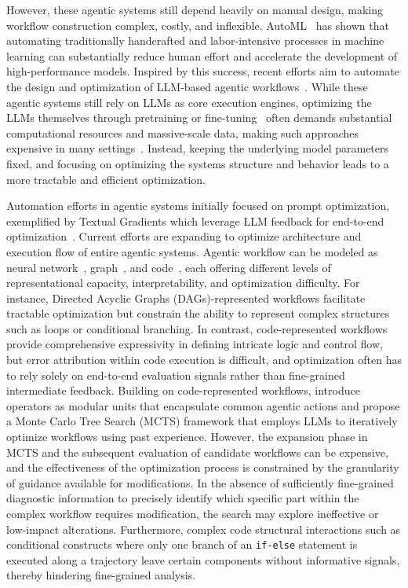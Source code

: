 \documentclass{article}
\theoremstyle{plain}
\theoremstyle{definition}
\theoremstyle{remark}
\begin{document}
However, these agentic systems still depend heavily on manual design, making workflow construction complex, costly, and inflexible. AutoML~\citep{10.5555/3360092} has shown that automating traditionally handcrafted and labor-intensive processes in machine learning can substantially reduce human effort and accelerate the development of high-performance models. Inspired by this success, recent efforts aim to automate the design and optimization of LLM-based agentic workflows~\citep{lee_compound_2025}. While these agentic systems still rely on LLMs as core execution engines, optimizing the LLMs themselves through pretraining or fine-tuning~\citep{rafailov_direct_2023} often demands substantial computational resources and massive-scale data, making such approaches expensive in many settings~\citep{kaplan_scaling_2020}. Instead, keeping the underlying model parameters fixed, and focusing on optimizing the systems structure and behavior leads to a more tractable and efficient optimization.

Automation efforts in agentic systems initially focused on prompt optimization, exemplified by Textual Gradients which leverage LLM feedback for end-to-end optimization~\citep{pryzant_automatic_2023, yuksekgonul_textgrad_2024, wang_how_2024, yin_llm-autodiff_2025}. Current efforts are expanding to optimize architecture and execution flow of entire agentic systems. Agentic workflow can be modeled as neural network~\citep{liu_dynamic_2024,ma_agentic_2025}, graph~\citep{zhuge_language_2024, zhang_multi-agent_2025}, and code~\citep{hu_automated_2025, zhang_aflow_2025, zheng_mermaidflow_2025}, each offering different levels of representational capacity, interpretability, and optimization difficulty. For instance, Directed Acyclic Graphs (DAGs)-represented workflows facilitate tractable optimization but constrain the ability to represent complex structures such as loops or conditional branching. In contrast, code-represented workflows provide comprehensive expressivity in defining intricate logic and control flow, but error attribution within code execution is difficult, and optimization often has to rely solely on end-to-end evaluation signals rather than fine-grained intermediate feedback. Building on code-represented workflows, \citet{zhang_aflow_2025} introduce operators as modular units that encapsulate common agentic actions and propose a Monte Carlo Tree Search (MCTS) framework that employs LLMs to iteratively optimize workflows using past experience. However, the expansion phase in MCTS and the subsequent evaluation of candidate workflows can be expensive, and the effectiveness of the optimization process is constrained by the granularity of guidance available for modifications. In the absence of sufficiently fine-grained diagnostic information to precisely identify which specific part within the complex workflow requires modification, the search may explore ineffective or low-impact alterations. Furthermore, complex code structural interactions such as conditional constructs where only one branch of an \texttt{if-else} statement is executed along a trajectory leave certain components without informative signals, thereby hindering fine-grained analysis. 
\end{document}
